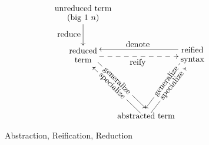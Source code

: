 \begin{figure}
    \[
    \xymatrix@C=1pt{
        \txt{unreduced term \\ (big $1$ $n$)} \ar[d]_{\txt{\\reduce}} \\
        \txt{reduced \\ term}
        \ar@<1ex>[ddr]|{\txt{\rotatebox{-45}{generalize}}}
        \ar@<-1ex>@{-->}[rr]_{\txt{reify}}
        &&
        \txt{reified \\ syntax}
        \ar@<-1ex>[ll]_{\txt{denote}}
        \ar@<-1ex>[ddl]|{\txt{\rotatebox{52}{generalize}}}
        \\ \\
        &
        \txt{abstracted term}
        \ar@<1ex>[uul]|{\txt{\rotatebox{-45}{specialize}}}
        \ar@<-1ex>[uur]|{\txt{\rotatebox{52}{specialize}}}
    }
    \]
    \caption{Abstraction, Reification, Reduction} \label{fig:reduce-denote-reify}
\end{figure}

